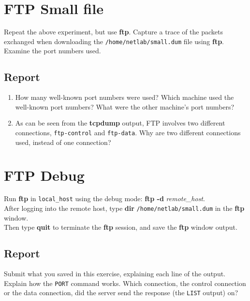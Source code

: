 \documentclass[10pt,a4paper]{article}
\numberwithin{equation}{section}
\numberwithin{figure}{section}
\numberwithin{table}{section}
\begin{document}
\section{FTP Small file}
	Repeat the above experiment, but use \textbf{ftp}.
	Capture a trace of the packets exchanged when downloading the \texttt{/home/netlab/small.dum} file using \textbf{ftp}. \\
	Examine the port numbers used.
	\subsection*{Report}
	\begin{enumerate}
		\item How many well-known port numbers were used?
		Which machine used the well-known port numbers?
		What were the other machine’s port numbers?
		\item As can be seen from the \textbf{tcpdump} output, FTP involves two different connections, \texttt{ftp-control} and \texttt{ftp-data}.
		Why are two different connections used, instead of one connection?
	\end{enumerate}

\section{FTP Debug}
	Run \textbf{ftp} in \texttt{local\_host} using the debug mode: \textbf{ftp -d} \textit{remote\_host}. \\
	After logging into the remote host, type \textbf{dir} \texttt{/home/netlab/small.dum} in the \textbf{ftp} window. \\
	Then type \textbf{quit} to terminate the \textbf{ftp} session, and save the \textbf{ftp} window output.
	\subsection*{Report}
	Submit what you saved in this exercise, explaining each line of the output.
	Explain how the \texttt{PORT} command works.
	Which connection, the control connection or the data connection, did the server send the response (the \texttt{LIST} output) on?
\end{document}
